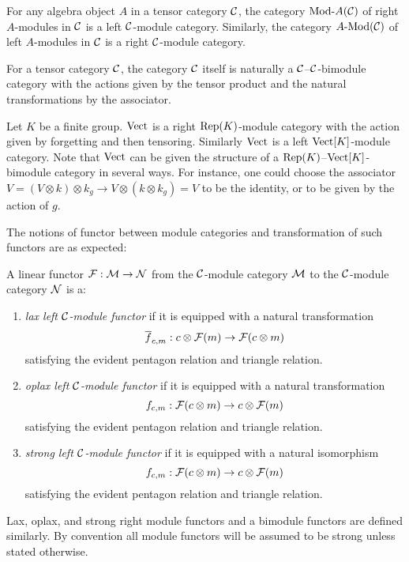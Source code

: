 \documentclass{amsart}
\begin{document}
\begin{example} \label{ex:ModulesAreModules}
	For any algebra object $A$ in a tensor category $\mathcal C$, the category $\Mod{}{A}(\cC)$ of right $A$-modules in $\mathcal C$ is a left $\mathcal C$-module category.  Similarly, the category $\Mod{A}{}(\cC)$ of left $A$-modules in $\mathcal C$ is a right $\mathcal C$-module category.
\end{example}

\begin{example}
For a tensor category $\mathcal C$, the category $\mathcal C$ itself is naturally a $\mathcal C$--$\mathcal C$-bimodule category with the actions given by the tensor product and the natural transformations by the associator.
\end{example}

\begin{example}
Let $K$ be a finite group. 
$\mathrm{Vect}$ is a right $\mathrm{Rep}(K)$-module category with the action given by forgetting and then tensoring.  Similarly $\mathrm{Vect}$ is a left $\mathrm{Vect}[K]$-module category.  Note that $\mathrm{Vect}$ can be given the structure of a $\mathrm{Rep}(K)$--$\mathrm{Vect}[K]$-bimodule category in several ways.  For instance, one could choose the associator $V = (V \otimes k) \otimes k_g \rightarrow V \otimes (k \otimes k_g) = V$ to be the identity, or to be given by the action of $g$.
\end{example}

The notions of functor between module categories and transformation of such functors are as expected:
\begin{definition}
A linear functor $\mathcal F: \mathcal M \rightarrow \mathcal N$ from the $\mathcal C$-module category $\mathcal M$ to the $\mathcal C$-module category $\mathcal N$ is a:
\begin{enumerate}
	\item \emph{lax left $\mathcal C$-module functor} if it is equipped with a natural transformation 
	\begin{equation*}
		\overline{f}_{c,m}:c \otimes \mathcal F(m) \rightarrow \mathcal F(c \otimes m)
	\end{equation*}
	 satisfying the evident pentagon relation and triangle relation.
	\item \emph{oplax left $\mathcal C$-module functor} if it is equipped with a natural transformation 
	\begin{equation*}
		f_{c,m}:\mathcal F(c \otimes m) \rightarrow c \otimes \mathcal F(m)
	\end{equation*}
	satisfying the evident pentagon relation and triangle relation.
	\item \emph{strong left $\mathcal C$-module functor} if it is equipped with a natural isomorphism 
	\begin{equation*}
		f_{c,m}:\mathcal F(c \otimes m) \rightarrow c \otimes \mathcal F(m)
	\end{equation*}
	satisfying the evident pentagon relation and triangle relation.
\end{enumerate} 
Lax, oplax, and strong right module functors and a bimodule functors are defined similarly. By convention all module functors will be assumed to be strong unless stated otherwise. 
\end{definition}
\end{document}
